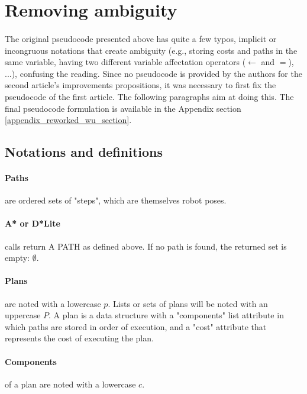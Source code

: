 \section{Removing ambiguity}\label{removing_ambiguity_section}

\paragraph{} The original pseudocode presented above has quite a few typos, implicit or incongruous notations that create ambiguity (e.g., storing costs and paths in the same variable, having two different variable affectation operators ($\gets$ and $=$), ...), confusing the reading. Since no pseudocode is provided by the authors for the second article's improvements propositions, it was necessary to first fix the pseudocode of the first article. The following paragraphs aim at doing this. The final pseudocode formulation is available in the Appendix section \ref{appendix_reworked_wu_section}.

\subsection{Notations and definitions}

\paragraph{Paths} are ordered sets of "steps", which are themselves robot poses.

\paragraph{A* or D*Lite} calls return A PATH as defined above. If no path is found, the returned set is empty: $\emptyset$.

\paragraph{Plans} are noted with a lowercase $p$. Lists or sets of plans will be noted with an uppercase $P$. A plan is a data structure with a "components" list attribute in which paths are stored in order of execution, and a "cost" attribute that represents the cost of executing the plan.

\paragraph{Components} of a plan are noted with a lowercase $c$.

